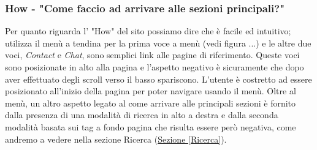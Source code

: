 \subsubsection{How - "Come faccio ad arrivare alle sezioni principali?"} \label{HHow}
Per quanto riguarda l' "How" del sito possiamo dire che è facile ed intuitivo; utilizza il menù a tendina per la prima voce a menù (vedi figura ...) e le altre due voci, \textit{Contact} e \textit{Chat}, sono semplici link alle pagine di riferimento.
Queste voci sono posizionate in alto alla pagina e l'aspetto negativo è sicuramente che dopo aver effettuato degli scroll verso il basso spariscono. L'utente è costretto ad essere posizionato all'inizio della pagina per poter navigare usando il menù.
Oltre al menù, un altro aspetto legato al come arrivare alle principali sezioni è fornito dalla presenza di una modalità di ricerca in alto a destra e dalla seconda modalità basata sui tag a fondo pagina che risulta essere però negativa, come andremo a vedere nella sezione Ricerca (\hyperref[Ricerca]{Sezione \ref{Ricerca}}).






